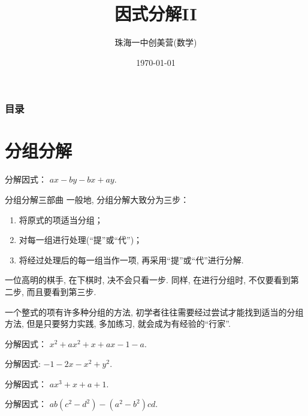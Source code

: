 \documentclass[aspectratio=169]{ctexbeamer}
\title[因式分解II]{因式分解II}
\subtitle{}
\author[珠海一中创美营]{珠海一中创美营(数学)}
\date[\today]{\today}
\theoremstyle{definition}
\begin{document}
\frame{\titlepage}
\begin{frame}
	\frametitle{目录}
	\tableofcontents
\end{frame}

\section{分组分解}
\begin{frame}[t]
	\begin{example}[分组分解三部曲]
		分解因式： $a x-b y-b x+a y .$
	\end{example}
\end{frame}

\begin{frame}{分组分解三部曲}
	一般地, 分组分解大致分为三步：
	\begin{enumerate}
		\item 将原式的项适当分组；
		\item 对每一组进行处理(“提”或“代”)；
		\item 将经过处理后的每一组当作一项, 再采用“提”或“代”进行分解.
	\end{enumerate}
	一位高明的棋手, 在下棋时, 决不会只看一步. 同样, 在进行分组时, 不仅要看到第二步, 而且要看到第三步.

	一个整式的项有许多种分组的方法, 初学者往往需要经过尝试才能找到适当的分组方法, 但是只要努力实践, 多加练习, 就会成为有经验的“行家”.
\end{frame}

\begin{frame}[t]
	\begin{example}[殊途同归]
		分解因式： $x^{2}+a x^{2}+x+a x-1-a$.
	\end{example}
\end{frame}

\begin{frame}[t]
	\begin{example}[瞄准公式]
		分解因式: $-1-2 x-x^{2}+y^{2}$.
	\end{example}
\end{frame}

\begin{frame}[t]
	\begin{example}[瞄准公式]
		分解因式： $a x^{3}+x+a+1$.
	\end{example}
\end{frame}

\begin{frame}[t]
	\begin{example}[从零开始]
		分解因式： $a b\left(c^{2}-d^{2}\right)-\left(a^{2}-b^{2}\right) c d.$
	\end{example}
\end{frame}
\end{document}
